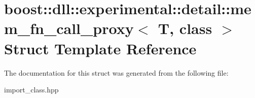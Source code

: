 \hypertarget{a01652}{}\section{boost\+:\+:dll\+:\+:experimental\+:\+:detail\+:\+:mem\+\_\+fn\+\_\+call\+\_\+proxy$<$ T, class $>$ Struct Template Reference}
\label{a01652}


The documentation for this struct was generated from the following file\+:\begin{DoxyCompactItemize}
\item 
import\+\_\+class.\+hpp\end{DoxyCompactItemize}
